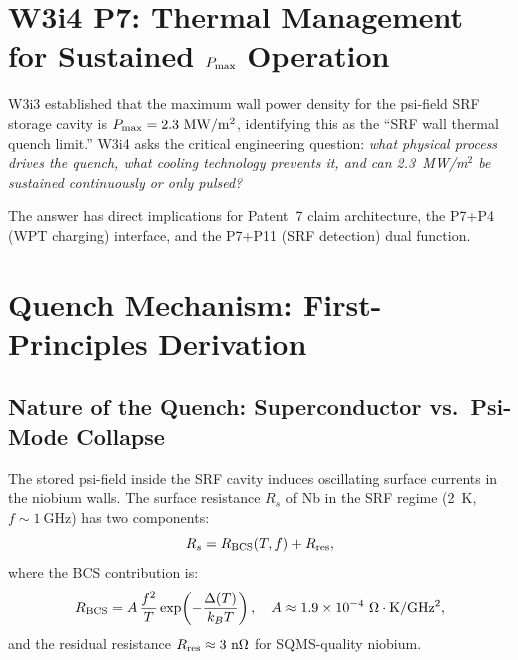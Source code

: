 \documentclass[aps,prd,twocolumn,superscriptaddress]{revtex4-2}
\newcommand{\Pmax}{P_{\rm max}}
\begin{document}
\maketitle

\section{W3i4 P7: Thermal Management for Sustained $\Pmax$ Operation}
\label{sec:intro}

W3i3 established that the maximum wall power density for the psi-field
SRF storage cavity is $\Pmax = 2.3~\mathrm{MW/m^2}$, identifying this
as the ``SRF wall thermal quench limit.'' W3i4 asks the critical
engineering question: \textit{what physical process drives the quench,
what cooling technology prevents it, and can 2.3~MW/m$^2$ be sustained
continuously or only pulsed?}

The answer has direct implications for Patent~7 claim architecture, the
P7+P4 (WPT charging) interface, and the P7+P11 (SRF detection) dual
function.

\section{Quench Mechanism: First-Principles Derivation}
\label{sec:quench}

\subsection{Nature of the Quench: Superconductor vs.\ Psi-Mode Collapse}

The stored psi-field inside the SRF cavity induces oscillating surface
currents in the niobium walls.  The surface resistance $R_s$ of Nb in
the SRF regime (2~K, $f \sim 1~\mathrm{GHz}$) has two components:
\begin{equation}
R_s = R_{\rm BCS}(T,f) + R_{\rm res},
\end{equation}
where the BCS contribution is:
\begin{equation}
R_{\rm BCS} = A\,\frac{f^2}{T}\exp\!\left(-\frac{\Delta(T)}{k_B T}\right),
\quad A \approx 1.9\times 10^{-4}~\Omega\cdot\mathrm{K/GHz^2},
\end{equation}
and the residual resistance $R_{\rm res} \approx 3~\mathrm{n\Omega}$
for SQMS-quality niobium.
\end{document}
